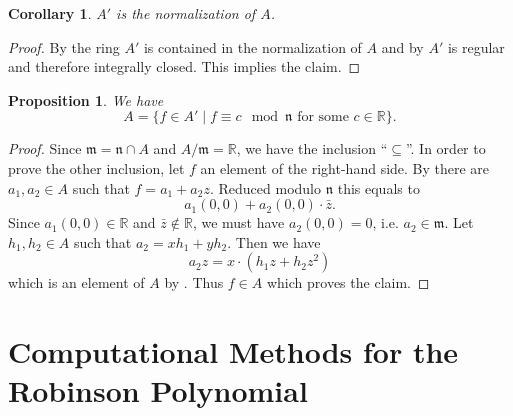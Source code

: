 \documentclass[a4paper,10pt]{amsart}
\theoremstyle{definition}
\theoremstyle{plain}
\newtheorem{prop}[Def]{Proposition}
\newtheorem{cor}[Def]{Corollary}
\newcommand{\fm}{{\mathfrak m}}
\newcommand{\fn}{{\mathfrak n}}
\newcommand{\R}{{\mathbb R}}
\begin{document}
\begin{cor}
 $A'$ is the normalization of $A$.
\end{cor}

\begin{proof}
By  the ring $A'$ is contained in the normalization of $A$ and by  $A'$ is regular and therefore integrally closed. This implies the claim.
\end{proof}

\begin{prop}\label{prop:Aexpl}
 We have
 \begin{equation*}
     A=\{f\in A'\mid f\equiv c\mod\fn\textrm{ for some }c\in\R\}.
 \end{equation*}
\end{prop}

\begin{proof}
Since $\fm=\fn\cap A$ and $A/\fm=\R$, we have the inclusion ``$\subseteq$''.
In order to prove the other inclusion, let $f$ an element of the right-hand side. By  there are $a_1,a_2\in A$ such that $f=a_1+a_2z$. Reduced modulo $\fn$ this equals to
\begin{equation*}
    a_1(0,0)+a_2(0,0)\cdot \bar{z}.
\end{equation*}
Since $a_1(0,0)\in\R$ and $\bar{z}\not\in\R$, we must have $a_2(0,0)=0$, i.e. $a_2\in\fm$. Let $h_1,h_2\in A$ such that $a_2=xh_1+yh_2$. Then we have
\begin{equation*}
    a_2z=x\cdot(h_1z+h_2z^2)
\end{equation*}
which is an element of $A$ by . Thus $f\in A$ which proves the claim.
\end{proof}





\section{Computational Methods for the Robinson Polynomial} \label{app:RobComp}
\end{document}
